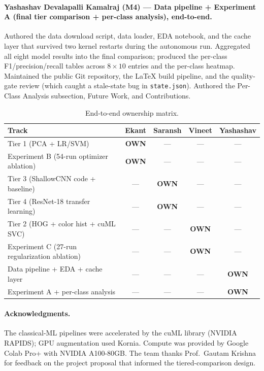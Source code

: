 \documentclass[10pt,letterpaper]{article}
\begin{document}
\paragraph{Yashashav Devalapalli Kamalraj (M4) --- Data pipeline + Experiment A (final tier comparison + per-class analysis), end-to-end.} Authored the data download script, data loader, EDA notebook, and the cache layer that survived two kernel restarts during the autonomous run. Aggregated all eight model results into the final comparison; produced the per-class F1/precision/recall tables across $8 \times 10$ entries and the per-class heatmap. Maintained the public Git repository, the LaTeX build pipeline, and the quality-gate review (which caught a stale-state bug in \texttt{state.json}). Authored the Per-Class Analysis subsection, Future Work, and Contributions.

\begin{table}[h]
\centering
\small
\caption{End-to-end ownership matrix.}
\label{tab:contributions}
\begin{tabular}{lcccc}
\toprule
\textbf{Track} & \textbf{Ekant} & \textbf{Saransh} & \textbf{Vineet} & \textbf{Yashashav} \\
\midrule
Tier 1 (PCA + LR/SVM)                            & \textbf{OWN} & --- & --- & --- \\
Experiment B (54-run optimizer ablation)         & \textbf{OWN} & --- & --- & --- \\
Tier 3 (ShallowCNN code + baseline)              & --- & \textbf{OWN} & --- & --- \\
Tier 4 (ResNet-18 transfer learning)             & --- & \textbf{OWN} & --- & --- \\
Tier 2 (HOG + color hist + cuML SVC)             & --- & --- & \textbf{OWN} & --- \\
Experiment C (27-run regularization ablation)    & --- & --- & \textbf{OWN} & --- \\
Data pipeline + EDA + cache layer                & --- & --- & --- & \textbf{OWN} \\
Experiment A + per-class analysis                & --- & --- & --- & \textbf{OWN} \\
\bottomrule
\end{tabular}
\end{table}

\paragraph{Acknowledgments.} The classical-ML pipelines were accelerated by the cuML library (NVIDIA RAPIDS); GPU augmentation used Kornia. Compute was provided by Google Colab Pro+ with NVIDIA A100-80GB. The team thanks Prof.\ Gautam Krishna for feedback on the project proposal that informed the tiered-comparison design.
\end{document}
